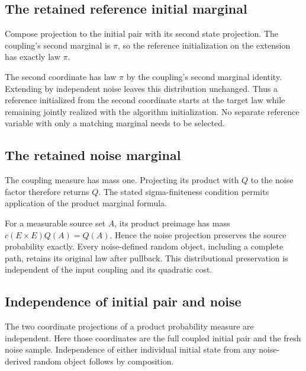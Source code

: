 \documentclass[11pt,a4paper]{article}
\begin{document}
\subsection{\texorpdfstring{The retained reference initial marginal}{The retained reference initial marginal}}


Compose projection to the initial pair with its second state projection. The coupling's second marginal is \(\pi\), so the reference initialization on the extension has exactly law \(\pi\).



The second coordinate has law \(\pi\) by the coupling's second marginal identity. Extending by independent noise leaves this distribution unchanged. Thus a reference initialized from the second coordinate starts at the target law while remaining jointly realized with the algorithm initialization. No separate reference variable with only a matching marginal needs to be selected.


\subsection{\texorpdfstring{The retained noise marginal}{The retained noise marginal}}


The coupling measure has mass one. Projecting its product with \(Q\) to the noise factor therefore returns \(Q\). The stated sigma-finiteness condition permits application of the product marginal formula.



For a measurable source set \(A\), its product preimage has mass \(c(E\times E)Q(A)=Q(A)\). Hence the noise projection preserves the source probability exactly. Every noise-defined random object, including a complete path, retains its original law after pullback. This distributional preservation is independent of the input coupling and its quadratic cost.


\subsection{\texorpdfstring{Independence of initial pair and noise}{Independence of initial pair and noise}}


The two coordinate projections of a product probability measure are independent. Here those coordinates are the full coupled initial pair and the fresh noise sample. Independence of either individual initial state from any noise-derived random object follows by composition.
\end{document}

